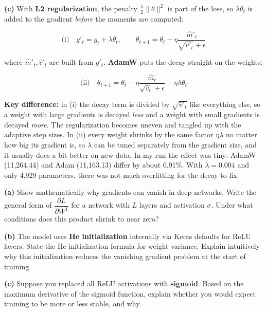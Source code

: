 \documentclass[12pt,a4paper]{article}
\begin{document}
\begin{answerbox}
\textbf{(c)} With \textbf{L2 regularization}, the penalty \(\frac{\lambda}{2}\|\theta\|^2\) is part of the loss, so \(\lambda\theta_t\) is added to the gradient \emph{before} the moments are computed:

\[\text{(i)}\quad g'_t=g_t+\lambda\theta_t,\qquad \theta_{t+1}=\theta_t-\eta\frac{\hat m'_t}{\sqrt{\hat v'_t}+\epsilon}\]

where \(\hat m'_t,\hat v'_t\) are built from \(g'_t\). \textbf{AdamW} puts the decay straight on the weights:

\[\text{(ii)}\quad \theta_{t+1}=\theta_t-\eta\frac{\hat m_t}{\sqrt{\hat v_t}+\epsilon}-\eta\lambda\theta_t\]

\textbf{Key difference:} in (i) the decay term is divided by \(\sqrt{\hat v'_t}\) like everything else, so a weight with large gradients is decayed \emph{less} and a weight with small gradients is decayed \emph{more}. The regularization becomes uneven and tangled up with the adaptive step sizes. In (ii) every weight shrinks by the same factor \(\eta\lambda\) no matter how big its gradient is, so \(\lambda\) can be tuned separately from the gradient size, and it usually does a bit better on new data. In my run the effect was tiny: AdamW (11,264.44) and Adam (11,163.13) differ by about 0.91\%. With \(\lambda=0.004\) and only 4,929 parameters, there was not much overfitting for the decay to fix.

\end{answerbox}

\begin{tcolorbox}[colback=lightblue!40, colframe=myColorB,
  title={\textbf{Question 5 — Vanishing Gradients} \hfill \normalfont(10 pts)},
  fonttitle=\normalsize\bfseries, breakable]

\textbf{(a)} Show mathematically why gradients can vanish in deep networks.
Write the general form of $\dfrac{\partial L}{\partial W^1}$ for a network
with $L$ layers and activation $\sigma$. Under what conditions does this product
shrink to near zero?

\textbf{(b)} The model uses \textbf{He initialization} internally via Keras defaults
for ReLU layers. State the He initialization formula for weight variance.
Explain intuitively why this initialization reduces the vanishing gradient problem
at the start of training.

\textbf{(c)} Suppose you replaced all ReLU activations with \textbf{sigmoid}.
Based on the maximum derivative of the sigmoid function, explain whether you
would expect training to be more or less stable, and why.
\end{tcolorbox}
\end{document}
